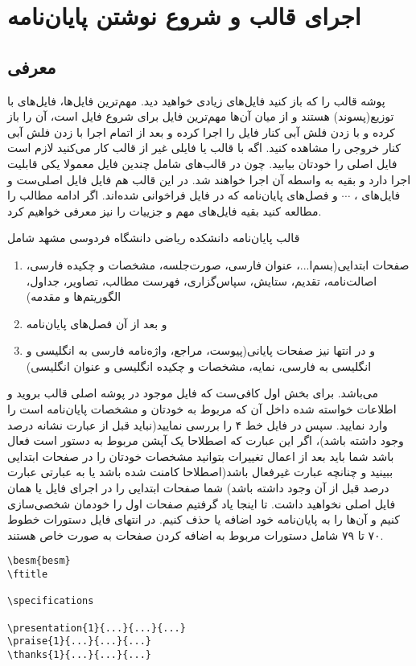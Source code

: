 \chapter{اجرای قالب و شروع نوشتن پایان‌نامه}
\section{معرفی}
پوشه قالب را که باز کنید فایل‌های زیادی خواهید دید. مهم‌ترین فایل‌ها، فایل‌های با توزیع(پسوند)  هستند و از میان آن‌ها مهم‌ترین فایل برای شروع فایل  است، آن را باز کرده و با زدن فلش آبی کنار  فایل را اجرا کرده و بعد از اتمام اجرا با زدن فلش آبی کنار  خروجی را مشاهده کنید. اگه با قالب یا فایلی غیر از قالب  کار می‌کنید لازم است فایل اصلی را خودتان بیابید. چون در قالب‌های شامل چندین فایل  معمولا یکی قابلیت اجرا دارد و بقیه به واسطه آن اجرا خواهند شد. در این قالب هم فایل  فایل اصلی‌ست و فایل‌های ، $\cdots$ و  فصل‌های پایان‌نامه که در فایل  فراخوانی شده‌اند. اگر ادامه مطالب را مطالعه کنید بقیه فایل‌های مهم و جزییات را نیز معرفی خواهیم کرد.


قالب پایان‌نامه دانشکده ریاضی دانشگاه فردوسی مشهد شامل 
\begin{enumerate}
\item
صفحات ابتدایی(بسم‌ا...، عنوان فارسی، صورت‌جلسه، مشخصات و چکیده فارسی، اصالت‌نامه، تقدیم، ستایش، سپاس‌گزاری، فهرست مطالب، تصاویر، جداول، الگوریتم‌ها و مقدمه) 
\item
و بعد از آن فصل‌های پایان‌نامه 
\item
و در انتها نیز صفحات پایانی(پیوست، مراجع، واژه‌نامه فارسی به انگلیسی و انگلیسی به فارسی، نمایه، مشخصات و چکیده انگلیسی و عنوان انگلیسی) 
\end{enumerate}
می‌باشد. برای بخش اول کافی‌ست که فایل  موجود در پوشه اصلی قالب بروید و اطلاعات خواسته شده داخل آن که مربوط به خودتان و مشخصات پایان‌نامه است را وارد نمایید. سپس در فایل  خط ۴ را بررسی نمایید(نباید قبل از عبارت  نشانه درصد وجود داشته باشد)، اگر این عبارت که اصطلاحا یک آپشن مربوط به دستور  است فعال باشد شما باید بعد از اعمال تغییرات بتوانید مشخصات خودتان را در صفحات ابتدایی ببینید و چنانچه عبارت  غیرفعال باشد(اصطلاحا کامنت شده باشد یا به عبارتی عبارت درصد قبل از آن وجود داشته باشد) شما صفحات ابتدایی را در اجرای فایل  یا همان فایل اصلی نخواهید داشت. تا اینجا یاد گرفتیم صفحات اول را خودمان شخصی‌سازی کنیم و آن‌ها را به پایان‌نامه خود اضافه یا حذف کنیم. در انتهای فایل   دستورات خطوط ۷۰ تا ۷۹ شامل دستورات مربوط به اضافه کردن صفحات به صورت خاص هستند.
\begin{latin}
\begin{verbatim}
\besm{besm}
\ftitle

\specifications

\presentation{1}{...}{...}{...}
\praise{1}{...}{...}{...}
\thanks{1}{...}{...}{...}
\end{verbatim}
\end{latin}

